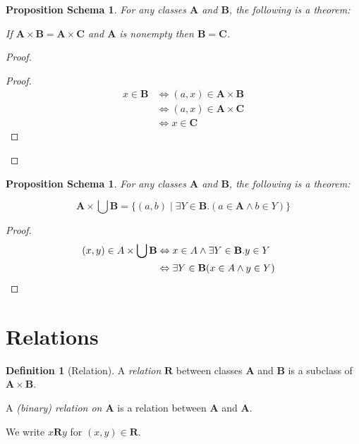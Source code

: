 \documentclass{book}
\let\qed\relax
\newtheorem{props}[ax]{Proposition Schema}
\theoremstyle{definition}
\newtheorem{df}[ax]{Definition}
\begin{document}
\begin{props}
For any classes $\mathbf{A}$ and $\mathbf{B}$, the following is a theorem:

If $\mathbf{A} \times \mathbf{B} = \mathbf{A} \times \mathbf{C}$ and $\mathbf{A}$ is nonempty then $\mathbf{B} = \mathbf{C}$.
\end{props}

\begin{proof}
\pf
{}
\begin{proof}
	\pf
	\begin{align*}
		x \in \mathbf{B} & \Leftrightarrow (a,x) \in \mathbf{A} \times \mathbf{B} \\
		& \Leftrightarrow (a,x) \in \mathbf{A} \times \mathbf{C} \\
		& \Leftrightarrow x \in \mathbf{C}
	\end{align*}
\end{proof}
\qed
\end{proof}

\begin{props}
For any classes $\mathbf{A}$ and $\mathbf{B}$, the following is a theorem:

\[ \mathbf{A} \times \bigcup \mathbf{B} = \{ (a,b) \mid \exists Y \in \mathbf{B}. (a \in \mathbf{A} \wedge b \in Y) \} \]
\end{props}

\begin{proof}
\pf
\begin{align*}
(x,y) \in A \times \bigcup \mathbf{B} & \Leftrightarrow x \in A \wedge \exists Y \in \mathbf{B}. y \in Y \\
& \Leftrightarrow \exists Y \in \mathbf{B} (x \in A \wedge y \in Y) & \qed
\end{align*}
\end{proof}

\section{Relations}

\begin{df}[Relation]
A \emph{relation} $\mathbf{R}$ between classes $\mathbf{A}$ and $\mathbf{B}$ is a subclass of $\mathbf{A} \times \mathbf{B}$.

A \emph{(binary) relation on $\mathbf{A}$} is a relation between $\mathbf{A}$ and $\mathbf{A}$.

We write $x \mathbf{R} y$ for $(x,y) \in \mathbf{R}$.
\end{df}
\end{document}

